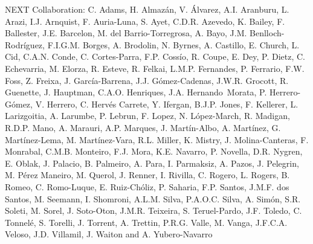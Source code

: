 NEXT Collaboration: C. Adams, H. Almaz\'an, V. \'Alvarez, A.I. Aranburu, L. Arazi, I.J. Arnquist, F. Auria-Luna, S. Ayet, C.D.R. Azevedo, K. Bailey, F. Ballester, J.E. Barcelon, M. del Barrio-Torregrosa, A. Bayo, J.M. Benlloch-Rodr\'{i}guez, F.I.G.M. Borges, A. Brodolin, N. Byrnes, A. Castillo, E. Church, L. Cid, C.A.N. Conde, C. Cortes-Parra, F.P. Coss\'io, R. Coupe, E. Dey, P. Dietz, C. Echevarria, M. Elorza, R. Esteve, R. Felkai, L.M.P. Fernandes, P. Ferrario, F.W. Foss, Z. Freixa, J. Garc\'ia-Barrena, J.J. G\'omez-Cadenas, J.W.R. Grocott, R. Guenette, J. Hauptman, C.A.O. Henriques, J.A. Hernando~Morata, P. Herrero-G\'omez, V. Herrero, C. Herv\'es Carrete, Y. Ifergan, B.J.P. Jones, F. Kellerer, L. Larizgoitia, A. Larumbe, P. Lebrun, F. Lopez, N. L\'opez-March, R. Madigan, R.D.P. Mano, A. Marauri, A.P. Marques, J. Mart\'in-Albo, A. Mart\'inez, G. Mart\'inez-Lema, M. Mart\'inez-Vara, R.L. Miller, K. Mistry, J. Molina-Canteras, F. Monrabal, C.M.B. Monteiro, F.J. Mora, K.E. Navarro, P. Novella, D.R. Nygren, E. Oblak, J. Palacio, B. Palmeiro, A. Para, I. Parmaksiz, A. Pazos, J. Pelegrin, M. P\'erez Maneiro, M. Querol, J. Renner, I. Rivilla, C. Rogero, L. Rogers, B. Romeo, C. Romo-Luque, E. Ruiz-Ch\'oliz, P. Saharia, F.P. Santos, J.M.F. dos Santos, M. Seemann, I. Shomroni, A.L.M. Silva, P.A.O.C. Silva, A. Sim\'on, S.R. Soleti, M. Sorel, J. Soto-Oton, J.M.R. Teixeira, S. Teruel-Pardo, J.F. Toledo, C. Tonnel\'e, S. Torelli, J. Torrent, A. Trettin, P.R.G. Valle, M. Vanga, J.F.C.A. Veloso, J.D. Villamil, J. Waiton and A. Yubero-Navarro